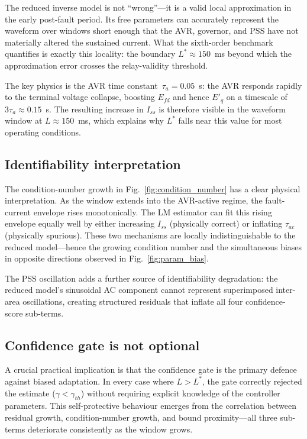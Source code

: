 \documentclass[journal,twoside,letterpaper]{IEEEtran}
\begin{document}
The reduced inverse model is not ``wrong''---it is a valid
local approximation in the early post-fault period.
Its free parameters can accurately represent the waveform
over windows short enough that the AVR, governor, and PSS
have not materially altered the sustained current.
What the sixth-order benchmark quantifies is exactly this
locality: the boundary $L^\ast \approx 150$~ms beyond which
the approximation error crosses the relay-validity threshold.

The key physics is the AVR time constant~$\tau_a = 0.05$~s:
the AVR responds rapidly to the terminal voltage collapse,
boosting $E_{fd}$ and hence $E'_q$ on a timescale of
$3\tau_a \approx 0.15$~s.
The resulting increase in $I_{ss}$ is therefore visible in
the waveform window at $L \approx 150$~ms, which explains
why $L^\ast$ falls near this value for most operating
conditions.

\subsection{Identifiability interpretation}

The condition-number growth in Fig.~\ref{fig:condition_number}
has a clear physical interpretation.
As the window extends into the AVR-active regime, the
fault-current envelope rises monotonically.
The LM estimator can fit this rising envelope equally well
by either increasing $I_{ss}$ (physically correct) or
inflating $\tau_{ac}$ (physically spurious).
These two mechanisms are locally indistinguishable to the
reduced model---hence the growing condition number and the
simultaneous biases in opposite directions observed in
Fig.~\ref{fig:param_bias}.

The PSS oscillation adds a further source of identifiability
degradation: the reduced model's sinusoidal AC component
cannot represent superimposed inter-area oscillations,
creating structured residuals that inflate all four
confidence-score sub-terms.

\subsection{Confidence gate is not optional}

A crucial practical implication is that the confidence gate
is the primary defence against biased adaptation.
In every case where $L > L^\ast$, the gate correctly rejected
the estimate ($\gamma < \gamma_{th}$) without requiring
explicit knowledge of the controller parameters.
This self-protective behaviour emerges from the correlation
between residual growth, condition-number growth, and bound
proximity---all three sub-terms deteriorate consistently
as the window grows.
\end{document}
